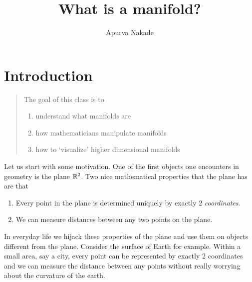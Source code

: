 \iffalse
It's unfair to say that mathematicians aren't real doctors, we perform surgeries all the time. In this class we'll introduce the notion of a topological manifold via simplicial (delta) complexes. Spend a day or two doing examples and go over several notions like orientation, cobordism and of course surgery.

Keywords: simplicial complex, manifold, orientation, cobordism, surgery

Type: Lecture
Homework: Recommended
Prereqs: None
\fi






\title{What is a manifold?}
\author{Apurva Nakade}
\thispagestyle{fancy}
\maketitle


\section{Introduction}
\begin{quote}
	The goal of this class is to
	\begin{enumerate}
		\item understand what manifolds are
		\item how mathematicians manipulate manifolds
		\item how to `visualize' higher dimensional manifolds
	\end{enumerate}
\end{quote}

Let us start with some motivation. One of the first objects one encounters in geometry is the plane $\mathbb{R}^2$.  Two nice mathematical properties that the plane has are that \begin{enumerate}
\item Every point in the plane is determined uniquely by exactly $2$ \emph{coordinates}.
\item We can measure distances between any two points on the plane.
\end{enumerate}

In everyday life we hijack these properties of the plane and use them on objects different from the plane. Consider the surface of Earth for example. Within a small area, say a city, every point can be represented by exactly 2 coordinates and we can measure the distance between any points without really worrying about the curvature of the earth.

